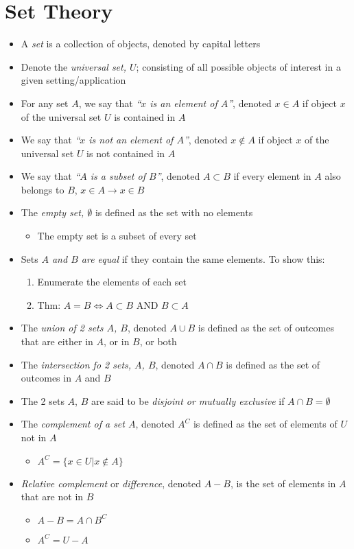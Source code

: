 \documentclass[10pt,letterpaper,final,twoside,notitlepage]{article}
\theoremstyle{plain}
\theoremstyle{definition}
\begin{document}
\section{Set Theory} \label{sec:Set Theory}
\begin{itemize}[noitemsep, nolistsep]
	\item A \emph{set} is a collection of objects, denoted by capital letters
	\item Denote the \emph{universal set, $U$}; consisting of all possible objects of interest in a given setting/application
	\item For any set $A$, we say that \emph{``$x$ is an element of $A$''}, denoted $x \in A$ if object $x$ of the universal set $U$ is contained in $A$
	\item We say that \emph{``$x$ is not an element of $A$''}, denoted $x \notin A$ if object $x$ of the universal set $U$ is not contained in $A$
	\item We say that \emph{``$A$ is a subset of $B$''}, denoted $A \subset B$ if every element in $A$ also belongs to $B$, $x \in A \rightarrow x \in B$
	\item The \emph{empty set, $\emptyset$} is defined as the set with no elements
		\begin{itemize}[noitemsep, nolistsep]
			\item The empty set is a subset of every set
		\end{itemize}
	\item Sets \emph{$A$ and $B$ are equal} if they contain the same elements. To show this:
		\begin{enumerate}
			\item Enumerate the elements of each set
			\item Thm: $A=B \iff A \subset B$ AND $B \subset A$
		\end{enumerate}
	\item The \emph{union of 2 sets $A$, $B$}, denoted $A \cup B$ is defined as the set of outcomes that are either in $A$, or in $B$, or both
	\item The \emph{intersection fo 2 sets, $A$, $B$}, denoted $A \cap B$ is defined as the set of outcomes in $A$ and $B$
	\item The 2 sets $A$, $B$ are said to be \emph{disjoint or mutually exclusive} if $A \cap B = \emptyset$
	\item The \emph{complement of a set $A$}, denoted $A^{C}$ is defined as the set of elements of $U$ not in $A$
		\begin{itemize}[noitemsep, nolistsep]
			\item $A^{C} = \lbrace x \in U \vert x \notin A \rbrace$
		\end{itemize}
	\item \emph{Relative complement} or \emph{difference}, denoted $A-B$, is the set of elements in $A$ that are not in $B$
		\begin{itemize}[noitemsep, nolistsep]
			\item $A-B = A \cap B^{C}$
			\item $A^{C} = U - A$
		\end{itemize}
\end{itemize}
\end{document}
